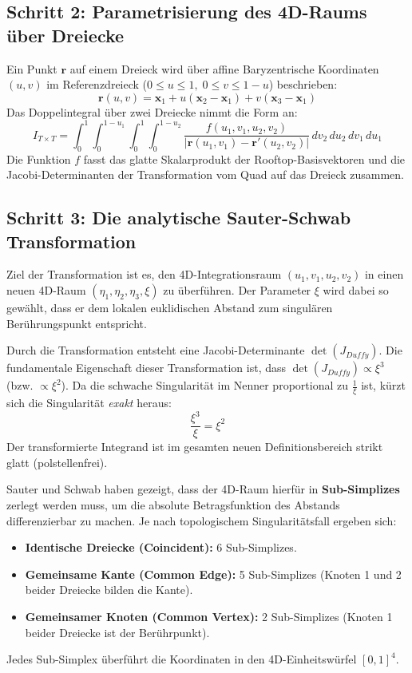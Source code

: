 \documentclass[11pt,a4paper]{article}
\begin{document}
\subsection{Schritt 2: Parametrisierung des 4D-Raums über Dreiecke}
Ein Punkt $\bm{r}$ auf einem Dreieck wird über affine Baryzentrische Koordinaten $(u, v)$ im Referenzdreieck ($0 \le u \le 1,\; 0 \le v \le 1-u$) beschrieben:
\begin{equation}
    \bm{r}(u,v) = \bm{x}_1 + u(\bm{x}_2 - \bm{x}_1) + v(\bm{x}_3 - \bm{x}_1)
\end{equation}
Das Doppelintegral über zwei Dreiecke nimmt die Form an:
\begin{equation}
    I_{T \times T} = \int_0^1 \int_0^{1-u_1} \int_0^1 \int_0^{1-u_2} \frac{f(u_1,v_1, u_2,v_2)}{|\bm{r}(u_1,v_1) - \bm{r}'(u_2,v_2)|} \,dv_2 \,du_2 \,dv_1 \,du_1
\end{equation}
Die Funktion $f$ fasst das glatte Skalarprodukt der Rooftop-Basisvektoren und die Jacobi-Determinanten der Transformation vom Quad auf das Dreieck zusammen.

\subsection{Schritt 3: Die analytische Sauter-Schwab Transformation}
Ziel der Transformation ist es, den 4D-Integrationsraum $(u_1, v_1, u_2, v_2)$ in einen neuen 4D-Raum $(\eta_1, \eta_2, \eta_3, \xi)$ zu überführen. Der Parameter $\xi$ wird dabei so gewählt, dass er dem lokalen euklidischen Abstand zum singulären Berührungspunkt entspricht. 

Durch die Transformation entsteht eine Jacobi-Determinante $\det(J_{Duffy})$. Die fundamentale Eigenschaft dieser Transformation ist, dass $\det(J_{Duffy}) \propto \xi^3$ (bzw. $\propto \xi^2$). Da die schwache Singularität im Nenner proportional zu $\frac{1}{\xi}$ ist, kürzt sich die Singularität \textit{exakt} heraus:
\begin{equation}
    \frac{\xi^3}{\xi} = \xi^2
\end{equation}
Der transformierte Integrand ist im gesamten neuen Definitionsbereich strikt glatt (polstellenfrei).

Sauter und Schwab haben gezeigt, dass der 4D-Raum hierfür in \textbf{Sub-Simplizes} zerlegt werden muss, um die absolute Betragsfunktion des Abstands differenzierbar zu machen. Je nach topologischem Singularitätsfall ergeben sich:
\begin{itemize}
    \item \textbf{Identische Dreiecke (Coincident):} 6 Sub-Simplizes.
    \item \textbf{Gemeinsame Kante (Common Edge):} 5 Sub-Simplizes (Knoten 1 und 2 beider Dreiecke bilden die Kante).
    \item \textbf{Gemeinsamer Knoten (Common Vertex):} 2 Sub-Simplizes (Knoten 1 beider Dreiecke ist der Berührpunkt).
\end{itemize}
Jedes Sub-Simplex überführt die Koordinaten in den 4D-Einheitswürfel $[0,1]^4$.
\end{document}
